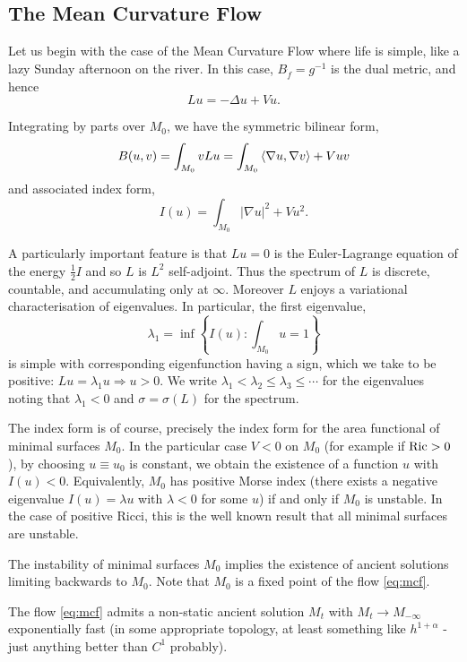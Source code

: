 \documentclass{amsart}
\begin{document}
\subsection{The Mean Curvature Flow}
\label{subsec:linearisation_mcf}

Let us begin with the case of the Mean Curvature Flow where life is simple, like a lazy Sunday afternoon on the river. In this case, \(B_{\dot{f}} = g^{-1}\) is the dual metric, and hence
\[
L u = -\Delta u + V u.
\]

Integrating by parts over \(M_0\), we have the symmetric bilinear form,
\[
B(u, v) = \int_{M_0} v Lu = \int_{M_0} \left\langle \nabla u,\nabla v \right\rangle + V uv 
\]
and associated index form,
\[
I(u) = \int_{M_0} |\nabla u|^2 + V u^2.
\]

A particularly important feature is that $L u = 0$ is the Euler-Lagrange equation of the energy \(\tfrac{1}{2} I\) and so \(L\) is $L^2$ self-adjoint. Thus the spectrum of \(L\) is discrete, countable, and accumulating only at \(\infty\). Moreover \(L\) enjoys a variational characterisation of eigenvalues. In particular, the first eigenvalue,
\[
\lambda_1 = \inf \left\{I(u) : \int_{M_0} u = 1\right\}
\]
is simple with corresponding eigenfunction having a sign, which we take to be positive: \(Lu = \lambda_1 u \Rightarrow u > 0\). We write \(\lambda_1 < \lambda_2 \leq \lambda_3 \leq \cdots\) for the eigenvalues noting that \(\lambda_1 < 0\) and \(\sigma = \sigma(L)\) for the spectrum.

The index form is of course, precisely the index form for the area functional of minimal surfaces \(M_0\). In the particular case \(V < 0\) on \(M_0\) (for example if \(\operatorname{Ric} > 0\)), by choosing \(u \equiv u_0\) is constant, we obtain the existence of a function \(u\) with \(I(u) < 0\). Equivalently, \(M_0\) has positive Morse index (there exists a negative eigenvalue \(I(u) = \lambda u\) with \(\lambda < 0\) for some \(u\)) if and only if \(M_0\) is unstable. In the case of positive Ricci, this is the well known result that all minimal surfaces are unstable.

The instability of minimal surfaces \(M_0\) implies the existence of ancient solutions limiting backwards to \(M_0\). Note that \(M_0\) is a fixed point of the flow \eqref{eq:mcf}.

\begin{thm}
\label{thm:ancient_existence}
The flow \eqref{eq:mcf} admits a non-static ancient solution \(M_t\) with \(M_t \to M_{-\infty}\) exponentially fast (in some appropriate topology, at least something like \(h^{1+\alpha}\) - just anything better than \(C^1\) probably).
\end{thm}
\end{document}
